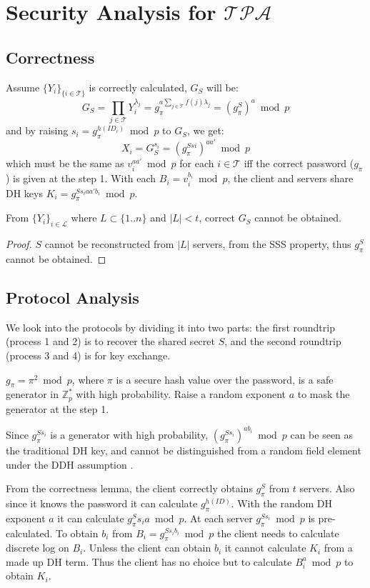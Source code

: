 \section{Security Analysis for $\mathcal{TPA}$}
\label{tpa}
\subsection{Correctness}
Assume $\{Y_i\}_{\{i \in \mathcal{T}\}}$ is correctly calculated,
$G_S$ will be:
\[
  G_S = \prod_{j \in \mathcal{T}}Y_i^{\lambda_j} = g_{\pi}^{a \sum_{j
      \in \mathcal{T}} f(j) \lambda_j} = (g_{\pi}^S)^a \bmod p
\]
and by raising $s_i = g_{\pi}^{h(ID_i)} \bmod p$ to $G_S$, we get:
\[
  X_i = G_S^{s_i} = (g_{\pi}^{Ssi})^{aa'} \bmod p
\]
which must be the same as $v_i^{aa'} \bmod p$ for each $i \in
\mathcal{T}$ iff the correct password ($g_{\pi}$) is given at the
step 1. With each $B_i = v_i^{b_i} \bmod p$, the client and servers
share DH keys $K_i = g_{\pi}^{Ss_iaa'b_i} \bmod p$.

\begin{lemma}
\label{tpa1}
From $\{Y_i\}_{i \in \mathcal{L}}$ where $L \subset \{1..n\}$ and $|L| <
t$, correct $G_S$ cannot be obtained.
\end{lemma}

\begin{proof}
$S$ cannot be reconstructed from $|L|$ servers, from the SSS
  property, thus $g_{\pi}^S$ cannot be obtained.
\end{proof}

\subsection{Protocol Analysis}
We look into the protocols by dividing it into two parts: the first
roundtrip (process 1 and 2) is to recover the shared secret $S$, and
the second roundtrip (process 3 and 4) is for key exchange.

$g_{\pi} = \pi^2 \bmod p$, where $\pi$ is a secure hash value over the
password, is a safe generator in $\mathbb{Z}^*_p$ with high
probability. Raise a random exponent $a$ to mask the generator at the
step 1. 

Since $g_{\pi}^{Ss_i}$ is a generator with high probability,
$(g_{\pi}^{Ss_i})^{ab_i} \bmod p$ can be seen as the traditional DH
key, and cannot be distinguished from a random field element under the
DDH assumption \cite{boneh}.

From the correctness lemma, the client correctly obtains
$g_{\pi}^S$ from $t$ servers. Also since it knows the password it can
calculate $g_{\pi}^{h(ID)}$. With the random DH exponent $a$ it can
calculate $g_{\pi}^Ss_ia \bmod p$. At each server $g_{\pi}^{Ss_i}
\bmod p$ is pre-calculated. To obtain $b_i$ from $B_i =
g_{\pi}^{Ss_ib_i} \bmod p$ the client needs to calculate discrete log
on $B_i$. Unless the client can obtain $b_i$ it cannot calculate $K_i$
from a made up DH term. Thus the client has no choice but to calculate
$B_i^a \bmod p$ to obtain $K_i$.

